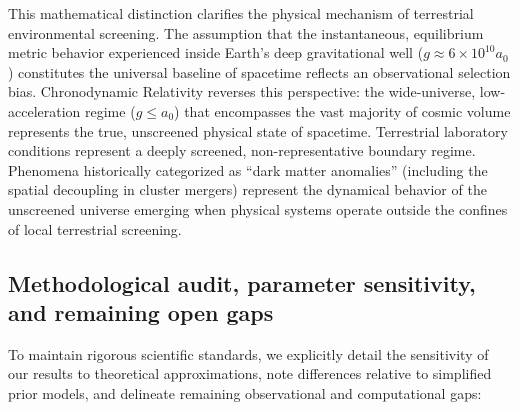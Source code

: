 \documentclass[aps,prd,reprint,superscriptaddress,nofootinbib,floatfix,amsmath,amssymb]{revtex4-2}
\begin{document}
This mathematical distinction clarifies the physical mechanism of terrestrial environmental screening. The assumption that the instantaneous, equilibrium metric behavior experienced inside Earth's deep gravitational well ($g \approx 6 \times 10^{10} a_0$) constitutes the universal baseline of spacetime reflects an observational selection bias. Chronodynamic Relativity reverses this perspective: the wide-universe, low-acceleration regime ($g \le a_0$) that encompasses the vast majority of cosmic volume represents the true, unscreened physical state of spacetime. Terrestrial laboratory conditions represent a deeply screened, non-representative boundary regime. Phenomena historically categorized as ``dark matter anomalies'' (including the spatial decoupling in cluster mergers) represent the dynamical behavior of the unscreened universe emerging when physical systems operate outside the confines of local terrestrial screening.

\subsection{Methodological audit, parameter sensitivity, and remaining open gaps}
\label{sec:audit_gaps}

To maintain rigorous scientific standards, we explicitly detail the sensitivity of our results to theoretical approximations, note differences relative to simplified prior models, and delineate remaining observational and computational gaps:
\end{document}
